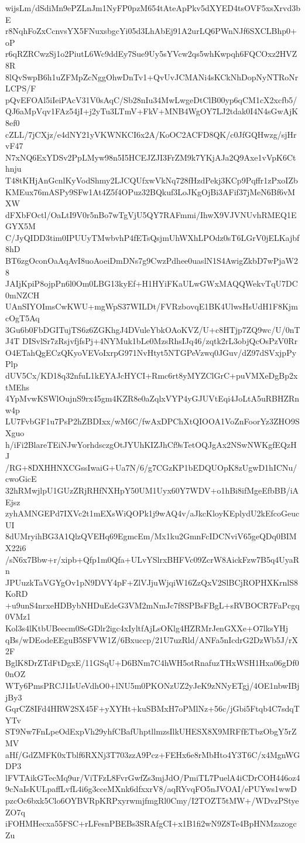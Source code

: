 wijsLm/dSdiMn9ePZLnJm1NyFP0pzM654tAteApPkv5dXYED4tsOVF5xsXrvd3bE
r8NqhFoZxCcnvsYX5FNuxsbgcYi05d3LhAbEj91A2urLQ6PWnNJf6SXCLBhp0+oP
r6qRZRCwzSj1o2PiutL6Wc9ddEy7Sue9Uy5sYVcw2qs5whKwpqh6FQCOxz2HVZ8R
8lQvSwpB6h1uZFMpZcNggOhwDnTv1+QvUvJCMANi4sKCkNhDopNyNTRoNrLCPS/F
pQvEFOAl5iIeiPAcV31V0sAqC/Sb28nIu34MwLwgeDtClB00yp6qCM1cX2xcfb5/
QJ6aMpVqv1FAz54jI+j2yTu3LTmV+FkV+MNB4WgOY7LJ2tdak0I4N4sGwAjK8ef0
cZLL/7jCXjz/e4dNY21yVKWNKCI6x2A/KoOC2ACFD8QK/c0JfGQHwzg/sjHrvF47
N7xNQ6ExYDSv2PpLMyw98n5I5HCEJZJI3FrZM9k7YKjAJa2Q9Axe1vVpK6Cthnju
T48tKHjAnGcnlKyVodShmy2LJCQUfxwVkNq728fHzdPekj3KCp9Pqffr1zPxoIZb
KMEux76mASPy9SFw1At4Z5f4OPuz32BQkuf3LoJKgOjBi3AFif37jMeN6Bf6vMXW
dFXbFOctl/OaLtI9V0r5nBo7wTgVjU5QY7RAFmmi/IhwX9VJVNUvhRMEQ1EGYX5M
C/JyQIDD3tim0IPUUyTMwbvhP4fETsQsjmUhWXhLPOdz0sT6LGrV0jELKajbf8hD
BT6zgOconOaAqAvI8uoAoeiDmDNs7g9CwzPdhee0uaslN1S4AwigZkbD7wPjaW28
JAIjKpiP8ojpPn6l0Om0LBG13kyEf+H1HYiFKaULwGWxMAQQWekvTqU7DC0mNZCH
UAnSIYOImsCwKWU+mgWpS37WILDt/FVRzbovqE1BK4UlwsHsUdH1F8KjmcOgT5Aq
3Gu6b0FbDGITujTS6z6ZGKhgJ4DVuleYbkOAoKVZ/U+c8HTjp7ZQ9wc/U/0nTJ4T
DISvlSr7zRsjvfjfsPj+4NYMuk1bLe0MzsRhsIJq46/zqtk2rL3objQcOsPzV0Rr
O4ETahQgECzQKyoVEVoIxrpG971NvHtyt5NTGPeVzwq0JGuv/dZ97dSVxjpPyPlp
dUV5Cx/KD18q32nfuL1kEYAJcHYCI+Rmc6rt8yMYZClGrC+puVMXeDgBp2xtMEhs
4YpMvwKSWlOujnS9rx45gm4KZR8e0aZqlxVYP4yGJUVtEqi4JoLtA5uRBHZRnw4p
LU7FvbGF1u7PsP2hZBDIxx/wM6C/fwAxDPChXtQIOOA1VoZnFoorYz3ZHO9SXguo
h/iFi2BlareTEiNJwYorhdsczgOtJYUhKIZJhCf9sTetOQJgAx2NSwNWKgfEQzHJ
/RG+8DXHHNXCGssIwaiG+Ua7N/6/g7CGzKP1bEDQUOpK8zUgwD1hICNu/cwoGicE
32hRMwjlpU1GUzZRjRHfNXHpY50UM1Uyx60Y7WDV+o1hBi8ifMgeEfbBB/iAEjsz
zyhAMNGEPd7IXVc2t1mEXsWiQOPk1j9wAQ4v/aJkcKloyKEplydU2kEfcoGeucUI
8dUMryihBG3A1QlzQVEHq69EgmcEm/Mx1ku2GmnFcIDCNviV65geQDq0BIMX22i6
/sN6x7Bbw+r/xipb+Qfp1m0Qfa+ULvYSlrxBHFVc09ZcrW8AickFzw7B5q4UyaRn
JPUuzkTaVGYgOv1pN9DVY4pF+ZlVJjuWjqiW16ZzQxV2SlBCjROPHXKrnlS8KoRD
+u9unS4nrxeHDBybNHDuEdeG3VM2mNmJc7f8SPBsFBgL+sRVBOCR7FaPcgq0VMz1
Kol3s4lKtbUBeecm0SeGDlr2igc4xIyltfAjLsOKlg4HZRMrJenGXXe+O7lksYHj
qBs/wDEodeEEguB5SFVW1Z/6Bxuccp/21U7uzRld/ANFa5nIcdrG2DzWb5J/rX2F
BglK8DrZTdFtDgxE/11GSqU+D6BNm7C4hWH5otRnafuzTHxWSH1Hxa06gDf00nOZ
WTy6PmsPRCJ1IsUeVdhO0+lNU5m0PKONzUZ2yJeK9zNNyETgj/4OE1nbwIBjjBy3
GqrCZ8IFd4HRW2SX45F+yXYHt+kuSBMxH7oPMlNz+56c/jGbi5Ftqb4C7sdqTYTv
ST9Nw7FnLpeOdExpVh29yhfCBafUhptllmzsIlkUHESX8X9MRFfETbzObgY5rZMV
aHf/GdZMFK0xTblf6RXNj3T703zzA9Pcz+FEHx6e8rMbHto4Y3T6C/x4MgnWGDP3
lFVTAikGTecMq9ur/ViTFzL8FvrGwfZs3mjJdO/PmiTL7PuelA4iCDrCOH446oz4
9cNaIsKULpaffLvfL4i6g3cceMXnk6dfxxrV8/aqRYvqFO5nJVOAI/ePUYws1wwD
pzcOc6bxk5Clo6OYBVRpKRPxyrwmjfmgRl0Cmy/I2TOZT5tMW+/WDvzPStyeZO7q
iFOHMHecxa55FSC+rLFesnPBEBs3SRAfgCI+x1B1fi2wN9Z8Te4BpHNMzazogcZu
